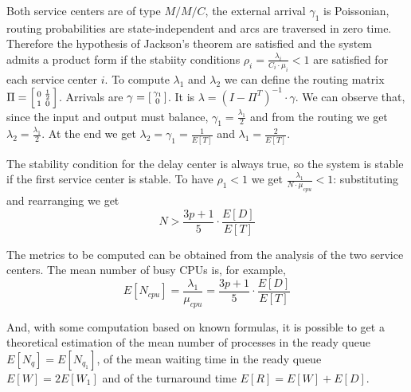 Both service centers are of type $M/M/C$, the external arrival $\gamma_1$ is Poissonian, routing probabilities are state-independent and arcs are traversed in zero time.
Therefore the hypothesis of Jackson's theorem are satisfied and the system admits a product form if the stabiity conditions $\rho_i=\frac{\lambda_i}{C_i\cdot \mu_i}<1$ are satisfied for each service center $i$.
To compute $\lambda_1$ and $\lambda_2$ we can define the routing matrix $\Pi=\begin{bsmallmatrix} 0 & \frac{1}{2} \\ 1 & 0 \end{bsmallmatrix}$. Arrivals are $\gamma=\begin{bsmallmatrix} \gamma_1 \\ 0 \end{bsmallmatrix}$.
It is $\lambda=(I-\Pi^T)^{-1}\cdot \gamma$. We can observe that, since the input and output must balance, $\gamma_1=\frac{\lambda_1}{2}$ and from the routing we get $\lambda_2=\frac{\lambda_1}{2}$. At the end we get $\lambda_2=\gamma_1=\frac{1}{E[T]}$ and $\lambda_1=\frac{2}{E[T]}$.

The stability condition for the delay center is always true, so the system is stable if the first service center is stable.
To have $\rho_1<1$ we get $\frac{\lambda_1}{N\cdot \mu_{cpu}}<1$: substituting and rearranging we get
\begin{equation}
    N > \frac{3p+1}{5}\cdot \frac{E[D]}{E[T]} 
\end{equation}

The metrics to be computed can be obtained from the analysis of the two
service centers. The mean number of busy CPUs is, for example,
\begin{equation}
    E[N_{cpu}]=\frac{\lambda_1}{\mu_{cpu}}=\frac{3p+1}{5}\cdot \frac{E[D]}{E[T]}
\end{equation}

And, with some computation based on known formulas, it is possible to get a theoretical estimation of
the mean number of processes in the ready queue $E[N_q]=E[N_{q_1}]$, of the mean
waiting time in the ready queue $E[W] = 2E[W_1]$ and of the turnaround
time $E[R] = E[W]+E[D]$.
